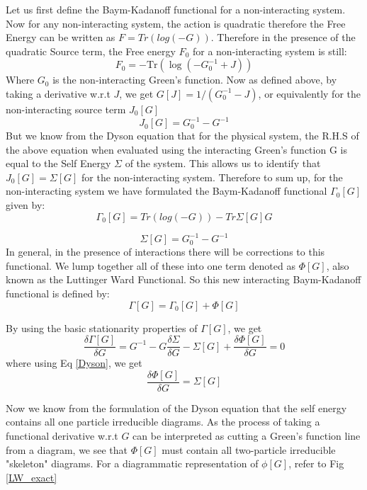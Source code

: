 \documentclass[10pt]{ruthesis}
\begin{document}
 Let us first define the Baym-Kadanoff functional for a non-interacting system. Now for any non-interacting system, the action is quadratic therefore the Free Energy can be written as $F=Tr(log(-G))$. Therefore in the presence of the quadratic Source term, the Free energy $F_0$ for a non-interacting system is still:
 \begin{equation}
 F_{0}= -\mathrm{Tr}(\log(-G_0^{-1} +J))
 \end{equation}
Where $G_{0}$ is the non-interacting Green's function. Now as defined above, by taking a derivative w.r.t $ J$, we get $G[J]= 1/ (G_0^{-1} -J)$, or equivalently for the non-interacting source term $J_0[G]$
\begin{equation}
 J_0[G]=G_0^{-1}- G^{-1}
 \end{equation} 
But we know from the Dyson equation that for the physical system, the R.H.S of the above equation when evaluated using the interacting Green's function G is equal to the Self Energy $\Sigma$ of the system. This allows us to identify that $J_0[G]=\Sigma[G]$ for the non-interacting system. Therefore to sum up, for the non-interacting system we have formulated the Baym-Kadanoff functional $\Gamma_0[G]$ given by:
\begin{equation}
\Gamma_0[G]= Tr(log(-G)) -Tr \Sigma[G]G
\end{equation}
 
\begin{equation}\label{Dyson}
 \Sigma[G]= G_0^{-1}- G^{-1}
\end{equation}
In general, in the presence of interactions there will be corrections to this functional. We lump together all of these into one term denoted as $\Phi[G]$, also known as the Luttinger Ward Functional. So this new interacting Baym-Kadanoff functional is defined by:
\begin{equation}
\Gamma[G]=\Gamma_0[G]+\Phi[G]
\end{equation}

By using the basic stationarity properties of $\Gamma[G]$, we get
\begin{equation}
\dfrac{\delta  \Gamma[G]}{\delta  G}= G^{-1} -G \dfrac{\delta  \Sigma}{\delta  G} -\Sigma[G] +\dfrac{\delta  \Phi[G]}{\delta  G}=0
\end{equation}
 where using Eq \ref{Dyson}, we get
 \begin{equation}\label{Luttinger-Sigma}
 \dfrac{\delta  \Phi[G]}{\delta  G}=\Sigma[G]
 \end{equation}
 
 Now we know from the formulation of the Dyson equation that the self energy contains all one particle irreducible diagrams. As the process of taking a functional derivative w.r.t $G$ can be interpreted as cutting a Green's function line from a diagram, we see that $\Phi[G]$ must contain all two-particle irreducible "skeleton" diagrams. For a diagrammatic representation of $\phi[G]$, refer to Fig \ref{LW_exact} 
\end{document}
